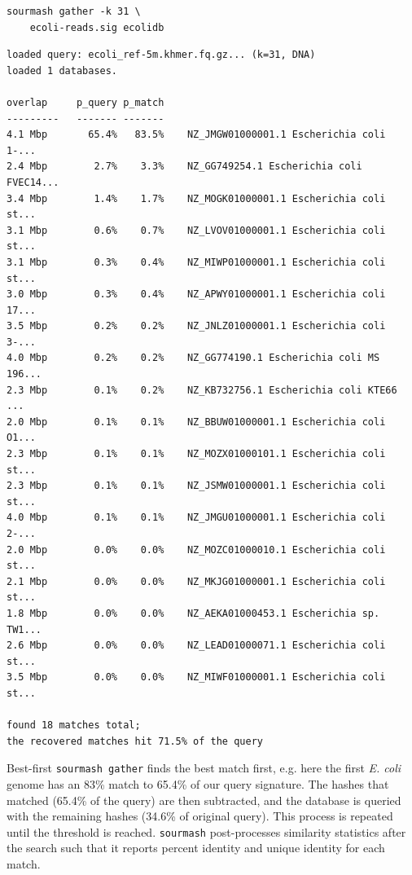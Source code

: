 \documentclass[10pt,a4paper,twocolumn]{article}
\begin{document}
\begin{lstlisting}
sourmash gather -k 31 \ 
    ecoli-reads.sig ecolidb
\end{lstlisting}

\begin{lstlisting}[basicstyle=\tiny,]
loaded query: ecoli_ref-5m.khmer.fq.gz... (k=31, DNA)
loaded 1 databases.

overlap     p_query p_match
---------   ------- -------
4.1 Mbp       65.4%   83.5%    NZ_JMGW01000001.1 Escherichia coli 1-...
2.4 Mbp        2.7%    3.3%    NZ_GG749254.1 Escherichia coli FVEC14...
3.4 Mbp        1.4%    1.7%    NZ_MOGK01000001.1 Escherichia coli st...
3.1 Mbp        0.6%    0.7%    NZ_LVOV01000001.1 Escherichia coli st...
3.1 Mbp        0.3%    0.4%    NZ_MIWP01000001.1 Escherichia coli st...
3.0 Mbp        0.3%    0.4%    NZ_APWY01000001.1 Escherichia coli 17...
3.5 Mbp        0.2%    0.2%    NZ_JNLZ01000001.1 Escherichia coli 3-...
4.0 Mbp        0.2%    0.2%    NZ_GG774190.1 Escherichia coli MS 196...
2.3 Mbp        0.1%    0.2%    NZ_KB732756.1 Escherichia coli KTE66 ...
2.0 Mbp        0.1%    0.1%    NZ_BBUW01000001.1 Escherichia coli O1...
2.3 Mbp        0.1%    0.1%    NZ_MOZX01000101.1 Escherichia coli st...
2.3 Mbp        0.1%    0.1%    NZ_JSMW01000001.1 Escherichia coli st...
4.0 Mbp        0.1%    0.1%    NZ_JMGU01000001.1 Escherichia coli 2-...
2.0 Mbp        0.0%    0.0%    NZ_MOZC01000010.1 Escherichia coli st...
2.1 Mbp        0.0%    0.0%    NZ_MKJG01000001.1 Escherichia coli st...
1.8 Mbp        0.0%    0.0%    NZ_AEKA01000453.1 Escherichia sp. TW1...
2.6 Mbp        0.0%    0.0%    NZ_LEAD01000071.1 Escherichia coli st...
3.5 Mbp        0.0%    0.0%    NZ_MIWF01000001.1 Escherichia coli st...

found 18 matches total;
the recovered matches hit 71.5% of the query
\end{lstlisting}

Best-first \lstinline{sourmash gather} finds the best match first, e.g. here the first \textit{E. coli} genome has an 83\% match to 65.4\% of our query signature. The hashes that matched (65.4\% of the query) are then subtracted, and the database is queried with the remaining hashes (34.6\% of original query). This process is repeated until the threshold is reached. \lstinline{sourmash} post-processes similarity statistics after the search such that it reports percent identity and unique identity for each match.
\end{document}
